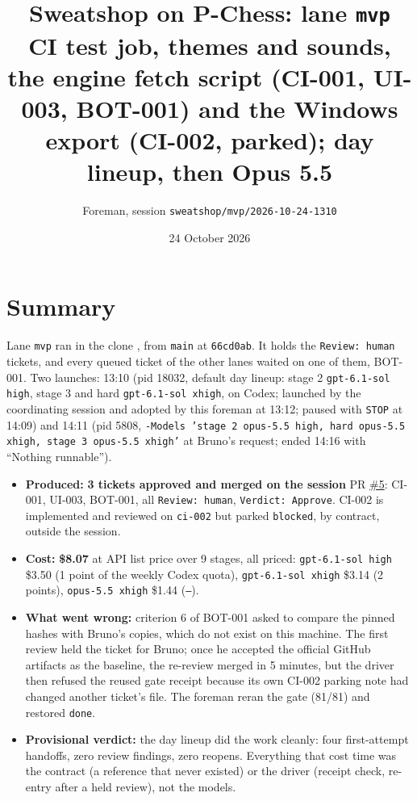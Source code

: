 \documentclass[11pt,a4paper]{article}
\title{Sweatshop on P-Chess: lane \texttt{mvp}\\\large CI test job, themes and sounds, the engine fetch script (CI-001, UI-003, BOT-001) and the Windows export (CI-002, parked); day lineup, then Opus 5.5}
\author{Foreman, session \texttt{sweatshop/mvp/2026-10-24-1310}}
\date{24 October 2026}
\begin{document}
\maketitle

\section*{Summary}

Lane \texttt{mvp} ran in the clone , from \texttt{main} at
\texttt{66cd0ab}. It holds the \texttt{Review: human} tickets, and every queued ticket of the
other lanes waited on one of them, BOT-001. Two launches: 13:10 (pid 18032, default day
lineup: stage 2 \texttt{gpt-6.1-sol high}, stage 3 and hard \texttt{gpt-6.1-sol xhigh}, on
Codex; launched by the coordinating session and adopted by this foreman at 13:12; paused with
\texttt{STOP} at 14:09) and 14:11 (pid 5808, \texttt{-Models 'stage 2 opus-5.5 high, hard
opus-5.5 xhigh, stage 3 opus-5.5 xhigh'} at Bruno's request; ended 14:16 with ``Nothing
runnable'').

\begin{itemize}
  \item \textbf{Produced:} \textbf{3 tickets approved and merged on the session} PR
        \href{https://github.com/Laginho/P-Chess/pull/5}{\#5}: CI-001, UI-003, BOT-001, all
        \texttt{Review: human}, \texttt{Verdict: Approve}. CI-002 is implemented and reviewed
        on \texttt{ci-002} but parked \texttt{blocked}, by contract, outside the session.
  \item \textbf{Cost:} \textbf{\$8.07} at API list price over 9 stages, all priced:
        \texttt{gpt-6.1-sol high} \$3.50 (1 point of the weekly Codex quota),
        \texttt{gpt-6.1-sol xhigh} \$3.14 (2 points), \texttt{opus-5.5 xhigh} \$1.44
        (\texttt{--}).
  \item \textbf{What went wrong:} criterion 6 of BOT-001 asked to compare the pinned hashes
        with Bruno's  copies, which do not exist on this machine. The first
        review held the ticket for Bruno; once he accepted the official GitHub artifacts as
        the baseline, the re-review merged in 5 minutes, but the driver then refused the
        reused gate receipt because its own CI-002 parking note had changed another ticket's
        file. The foreman reran the gate (81/81) and restored \texttt{done}.
  \item \textbf{Provisional verdict:} the day lineup did the work cleanly: four first-attempt
        handoffs, zero review findings, zero reopens. Everything that cost time was the
        contract (a reference that never existed) or the driver (receipt check, re-entry
        after a held review), not the models.
\end{itemize}
\end{document}
